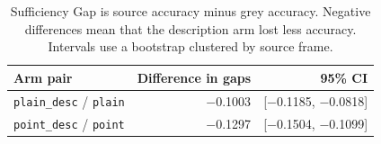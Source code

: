 \begin{table}[ht]
\centering
\caption[Description comparisons in Sufficiency Gap]{Sufficiency Gap is source
accuracy minus grey accuracy. Negative differences mean that the description
arm lost less accuracy. Intervals use a bootstrap clustered by source frame.}
\label{tab:rq1-sufficiency}
\begin{tabular}{L{4.0cm}rr}
\toprule
Arm pair & Difference in gaps & 95\% CI \\
\midrule
\texttt{plain\_desc} / \texttt{plain} & $-$0.1003 & [$-$0.1185, $-$0.0818] \\
\texttt{point\_desc} / \texttt{point} & $-$0.1297 & [$-$0.1504, $-$0.1099] \\
\bottomrule
\end{tabular}
\end{table}
